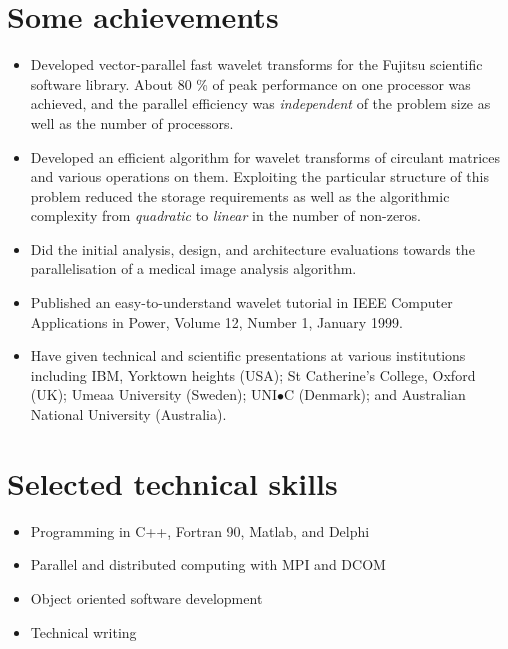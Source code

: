 \documentclass[12pt,a4paper]{article}
\begin{document}
\section*{Some achievements}
\begin{itemize} 
  \item Developed vector-parallel fast wavelet transforms
  for the Fujitsu scientific software library.
  About 80 \% of peak performance on one processor was achieved,
  and the parallel efficiency was {\em independent} of the problem size
  as well as the number of processors. 
  \item Developed an efficient algorithm for 
  wavelet transforms of circulant matrices 
  and various operations on them.
  Exploiting the particular structure of this problem 
  reduced the storage requirements as well as the algorithmic complexity 
  from {\em quadratic} to {\em linear} in the number of non-zeros.
  \item Did the initial analysis, design, and architecture evaluations 
  towards the parallelisation of a medical image analysis algorithm.
  \item Published an easy-to-understand wavelet tutorial
  in IEEE Computer Applications in Power, Volume 12, Number 1, January 1999.
  \item Have given technical and scientific presentations at 
  various institutions including IBM, Yorktown heights (USA); 
  St Catherine's College, Oxford (UK); Umeaa University (Sweden); 
  UNI$\bullet$C (Denmark); and Australian National University (Australia).
\end{itemize} 

\section*{Selected technical skills}
\begin{itemize} 
  \item Programming in C++, Fortran 90, Matlab, and Delphi 
  \item Parallel and distributed computing with MPI and DCOM
  \item Object oriented software development
  \item Technical writing
\end{itemize} 
  
\end{document}
